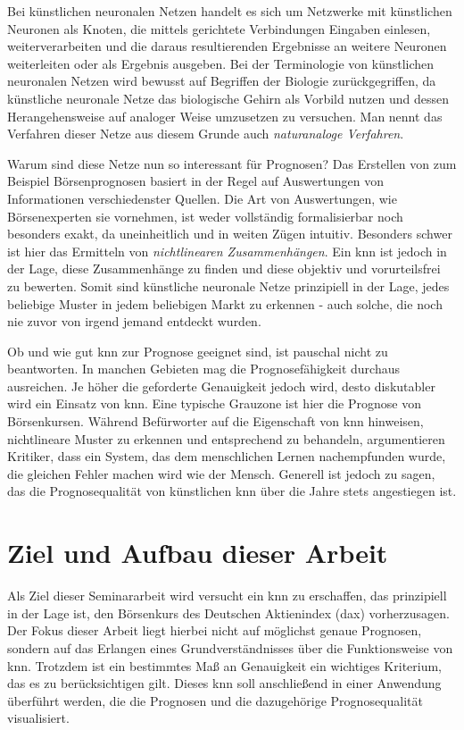 \documentclass[a4paper,DIV11,bibliography=totoc,headings=normal,ngerman,headsepline,listof=totoc,parskip=half]{scrreprt}
\begin{document}
Bei künstlichen neuronalen Netzen handelt es sich um Netzwerke mit künstlichen Neuronen als Knoten, die mittels gerichtete Verbindungen Eingaben einlesen, weiterverarbeiten und die daraus resultierenden Ergebnisse an weitere Neuronen weiterleiten oder als Ergebnis ausgeben. Bei der Terminologie von künstlichen neuronalen Netzen wird bewusst auf Begriffen der Biologie zurückgegriffen, da künstliche neuronale Netze das biologische Gehirn als Vorbild nutzen und dessen Herangehensweise auf analoger Weise umzusetzen zu versuchen. Man nennt das Verfahren dieser Netze aus diesem Grunde auch \textit{naturanaloge Verfahren}.

Warum sind diese Netze nun so interessant für Prognosen? Das Erstellen von zum Beispiel Börsenprognosen basiert in der Regel auf Auswertungen von Informationen verschiedenster Quellen. Die Art von Auswertungen, wie Börsenexperten sie vornehmen, ist weder vollständig formalisierbar noch besonders exakt, da uneinheitlich und in weiten Zügen intuitiv. Besonders schwer ist hier das Ermitteln von \textit{nichtlinearen Zusammenhängen}. Ein \ac{knn} ist jedoch in der Lage, diese Zusammenhänge zu finden  und diese objektiv und vorurteilsfrei zu bewerten. Somit sind künstliche neuronale Netze prinzipiell in der Lage, jedes beliebige Muster in jedem beliebigen Markt zu erkennen - auch solche, die noch nie zuvor von irgend jemand entdeckt wurden.

Ob und wie gut \ac{knn} zur Prognose geeignet sind, ist pauschal nicht zu beantworten. In manchen Gebieten mag die Prognosefähigkeit durchaus ausreichen. Je höher die geforderte Genauigkeit jedoch wird, desto diskutabler wird ein Einsatz von \ac{knn}. Eine typische Grauzone ist hier die Prognose von Börsenkursen. Während Befürworter auf die Eigenschaft von \ac{knn} hinweisen, nichtlineare Muster zu erkennen und entsprechend zu behandeln, argumentieren Kritiker, dass ein System, das dem menschlichen Lernen nachempfunden wurde, die gleichen Fehler machen wird wie der Mensch. Generell ist jedoch zu sagen, das die Prognosequalität von künstlichen \ac{knn} über die Jahre stets angestiegen ist.


\section{Ziel und Aufbau dieser Arbeit}
\label{sec:Ziel}
Als Ziel dieser Seminararbeit wird versucht ein \ac{knn} zu erschaffen, das prinzipiell in der Lage ist, den Börsenkurs des Deutschen Aktienindex (\acs{dax}) vorherzusagen. Der Fokus dieser Arbeit liegt hierbei nicht auf möglichst genaue Prognosen, sondern auf das Erlangen eines Grundverständnisses über die Funktionsweise von \ac{knn}. Trotzdem ist ein bestimmtes Maß an Genauigkeit ein wichtiges Kriterium, das es zu berücksichtigen gilt. Dieses \ac{knn} soll anschließend in einer Anwendung überführt werden, die die Prognosen und die dazugehörige Prognosequalität visualisiert.
\end{document}
